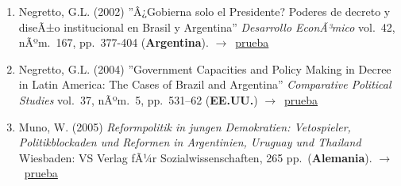 \documentclass[12 pt, letter]{article}
\newenvironment{CitasMiTrabajo}{
    \begin{footnotesize}
    \begin{enumerate}[label={\footnotesize\emph{cita~\arabic*}},ref=\arabic*] %
        \setlength{\itemsep}{.1\itemsep}
        \setlength{\parskip}{.1\parskip}
    }{\end{enumerate}\end{footnotesize}}
\begin{document}
        \begin{CitasMiTrabajo}

        \item Negretto, G.L. (2002)
        ''Â¿Gobierna solo el Presidente? Poderes de decreto y diseÃ±o institucional en Brasil y Argentina'' \emph{Desarrollo EconÃ³mico}
        vol.\ 42, nÃºm.\ 167, pp.\ 377-404 (\textbf{Argentina}). $\rightarrow$~\href{http://ericmagar.com/cv/cites/decreeArg/negre2.pdf}{prueba}

        \item Negretto, G.L. (2004)
        ''Government Capacities and Policy Making in
        Decree in Latin America: The Cases of Brazil and Argentina''
        \emph{Comparative Political Studies} vol.\ 37, nÃºm.\ 5, pp.\ 531--62 (\textbf{EE.UU.}) $\rightarrow$~\href{http://ericmagar.com/cv/cites/decreeArg/negre.pdf}{prueba}

        \item Muno, W. (2005)
        \emph{Reformpolitik in jungen Demokratien:
        Vetospieler, Politikblockaden und Reformen in Argentinien, Uruguay und
        Thailand} Wiesbaden: VS Verlag fÃ¼r Sozialwissenschaften, 265 pp.\ (\textbf{Alemania}). $\rightarrow$~\href{http://ericmagar.com/cv/cites/decreeArg/muno.pdf}{prueba}

        \label{ncites:magarArgDecrees2001} %

        \end{CitasMiTrabajo}





\end{document}
